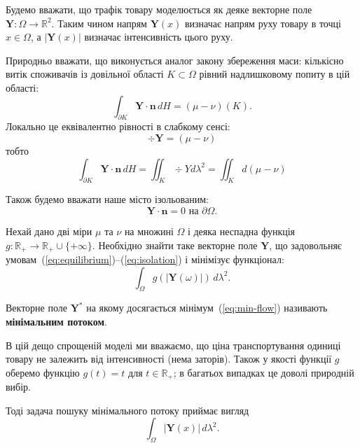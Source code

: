 Будемо вважати, що трафік товару моделюється як деяке векторне поле $\mathbf{Y} : \Omega \to \mathbb{R}^2$. 
Таким чином напрям $\mathbf Y(x)$ визначає напрям руху товару в точці $x \in \Omega$,
а $\left|\mathbf{Y}(x)\right|$ визначає інтенсивність цього руху.

Природньо вважати, що виконується аналог закону збереження маси:
кількісно витік споживачів із довільної області $K \subset \Omega$ рівний надлишковому попиту в цій області:
\begin{equation*}
    \int_{\partial K} \mathbf{Y} \cdot \mathbf{n}\, dH = (\mu - \nu)(K).
\end{equation*} 
Локально це еквівалентно рівності в слабкому сенсі:
\begin{equation}
    \label{eq:equilibrium}
    \div{\mathbf{Y}} = (\mu - \nu)
\end{equation}
тобто
$$
    \int_{\partial K} \mathbf{Y} \cdot \mathbf{n}\, dH = \iint_{K} \div{Y} d\lambda^2 =
    \iint_{K} d(\mu - \nu)
$$

Також будемо вважати наше місто ізольованим:
\begin{equation}
    \label{eq:isolation}
    \mathbf{Y} \cdot \mathbf{n} = 0\text{ на }\partial \Omega.
\end{equation}

\begin{definition}
    \label{def:min-flow}
    Нехай дано дві міри $\mu$ та $\nu$ на множині $\Omega$
    і деяка неспадна функція $g : \mathbb{R}_+ \to \mathbb{R}_+ \cup \{+\infty\}$.
    Необхідно знайти таке векторне поле $\mathbf{Y}$, що задовольняє умовам~(\ref{eq:equilibrium})--(\ref{eq:isolation})
    і мінімізує функціонал:
    \begin{equation}
        \label{eq:min-flow}
         \int_\Omega g\left(\left|\mathbf{Y}(\omega)\right|\right)\, d\lambda^2.
    \end{equation}
       
    Векторне поле $\mathbf{Y}^*$ на якому досягається мінімум~(\ref{eq:min-flow}) називають \textbf{мінімальним потоком}.
\end{definition}

В цій дещо спрощеній моделі ми вважаємо, що ціна транспортування одиниці товару не залежить від інтенсивності (нема заторів).
Також у якості функції $g$ оберемо функцію $g(t) = t$ для $t \in \mathbb{R}_+$; в багатьох випадках це доволі природній вибір.

Тоді задача пошуку мінімального потоку приймає вигляд
$$
    \int_{\Omega} \left|\mathbf{Y}(x)\right|\, d\lambda^2.
$$

